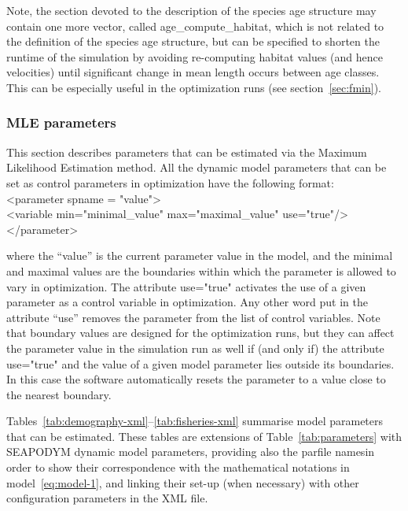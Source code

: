 Note, the section devoted to the description of the species age structure may contain one more vector, called {\ttfamily age\_compute\_habitat}, which is not related to the definition of the species age structure, but can be specified to shorten the runtime of the simulation by avoiding re-computing habitat values (and hence velocities) until significant change in mean length occurs between age classes. This can be especially useful in the optimization runs (see section~\ref{sec:fmin}). 

\subsubsection{MLE parameters}
\label{sec:mle_parameters}

This section describes parameters that can be estimated via the Maximum Likelihood Estimation method. All the dynamic model parameters that can be set as control parameters in optimization have the following format:\\ 

\noindent
{\ttfamily 
\makebox[1.5cm]{} <parameter spname = "value"> \\
\makebox[1.5cm]{} <variable min="minimal\_value" max="maximal\_value" use="true"/> \\
\makebox[1.5cm]{} </parameter>\\
} 

\noindent where the ``value'' is the current parameter value in the model, and the minimal and maximal values are the boundaries within which the parameter is allowed to vary in optimization. The attribute {\ttfamily use="true"} activates the use of a given parameter as a control variable in optimization. Any other word put in the attribute ``use'' removes the parameter from the list of control variables. Note that boundary values are designed for the optimization runs, but they can affect the parameter value in the simulation run as well if (and only if) the attribute {\ttfamily use="true"} and the value of a given model parameter lies outside its boundaries. In this case the software automatically resets the parameter to a value close to the nearest boundary.

Tables~\ref{tab:demography-xml}--\ref{tab:fisheries-xml} summarise model parameters that can be estimated. These tables are extensions of Table~\ref{tab:parameters} with SEAPODYM dynamic model parameters, providing also the parfile names\footnotemark[1] in order to show their correspondence with the mathematical notations in model~\ref{eq:model-1}, and linking their set-up (when necessary) with other configuration parameters in the XML file.

